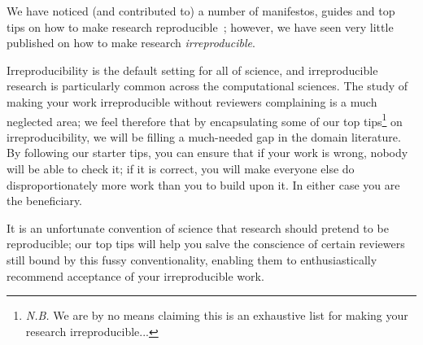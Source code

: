 \documentclass[a4paper,11pt]{article}
\begin{document}
We have noticed (and contributed to) a number of manifestos, guides
and top tips on how to make research
reproducible~\cite{prlic+procter:2012,sandve-et-al:2013,gent:2013,joppa-et-al:2013,gent_recomputation.org_2014,wilson-et-al:2014,goble:2014,crick-et-al_wssspe2,crick-et-al_recomp2014,stodden+miguez:2014};
however, we have seen very little published on how to make research
\emph{irreproducible}.

Irreproducibility is the default setting for all of science, and
irreproducible research is particularly common across the
computational sciences. The study of making your work irreproducible
without reviewers complaining is a much neglected area; we feel
therefore that by encapsulating some of our top
tips\footnote{{\emph{N.B.}} We are by no means claiming this is an
exhaustive list for making your research irreproducible...} on
irreproducibility, we will be filling a much-needed gap in the domain
literature. By following our starter tips, you can ensure that if your
work is wrong, nobody will be able to check it; if it is correct, you
will make everyone else do disproportionately more work than you to
build upon it. In either case you are the beneficiary.

It is an unfortunate convention of science that research should
pretend to be reproducible; our top tips will help you salve the
conscience of certain reviewers still bound by this fussy
conventionality, enabling them to enthusiastically recommend
acceptance of your irreproducible work.
\end{document}
